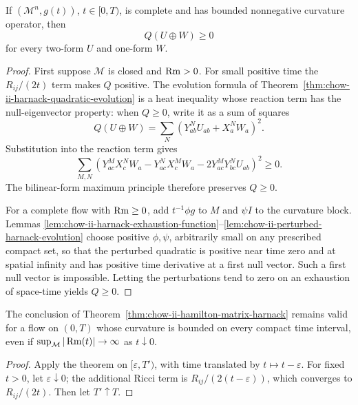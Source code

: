 \begin{theorem}
\label{thm:chow-ii-hamilton-matrix-harnack}
If \((\mathcal M^n,g(t))\), \(t\in[0,T)\), is complete and has bounded
nonnegative curvature operator, then
\[
Q(U\oplus W)\ge0
\]
for every two-form \(U\) and one-form \(W\).
\end{theorem}
\begin{proof}
First suppose \(\mathcal M\) is closed and \(\operatorname{Rm}>0\).  For small positive
time the \(R_{ij}/(2t)\) term makes \(Q\) positive.  The evolution formula of
Theorem~\ref{thm:chow-ii-harnack-quadratic-evolution} is a heat inequality
whose reaction term has the null-eigenvector property: when \(Q\ge0\), write
it as a sum of squares
\[
Q(U\oplus W)=\sum_N(Y^N_{ab}U_{ab}+X^N_aW_a)^2.
\]
Substitution into the reaction term gives
\[
\sum_{M,N}(Y^M_{ac}X^N_cW_a-Y^N_{ac}X^M_cW_a
-2Y^M_{ac}Y^N_{bc}U_{ab})^2\ge0.
\]
The bilinear-form maximum principle therefore preserves \(Q\ge0\).

For a complete flow with \(\operatorname{Rm}\ge0\), add \(t^{-1}\phi g\) to \(M\) and
\(\psi I\) to the curvature block.  Lemmas
\ref{lem:chow-ii-harnack-exhaustion-function}--\ref{lem:chow-ii-perturbed-harnack-evolution}
choose positive \(\phi,\psi\), arbitrarily small on any prescribed compact
set, so that the perturbed quadratic is positive near time zero and at spatial
infinity and has positive time derivative at a first null vector.  Such a
first null vector is impossible.  Letting the perturbations tend to zero on
an exhaustion of space-time yields \(Q\ge0\).
\end{proof}

\begin{remark}
\label{rem:chow-ii-harnack-open-initial-time}
The conclusion of Theorem~\ref{thm:chow-ii-hamilton-matrix-harnack} remains
valid for a flow on \((0,T)\) whose curvature is bounded on every compact time
interval, even if \(\sup_{\mathcal M}|\Rm(t)|\to\infty\) as \(t\downarrow0\).
\end{remark}
\begin{proof}
Apply the theorem on \([\varepsilon,T')\), with time translated by
\(t\mapsto t-\varepsilon\).  For fixed \(t>0\), let
\(\varepsilon\downarrow0\); the additional Ricci term is
\(R_{ij}/(2(t-\varepsilon))\), which converges to \(R_{ij}/(2t)\).
Then let \(T'\uparrow T\).
\end{proof}

